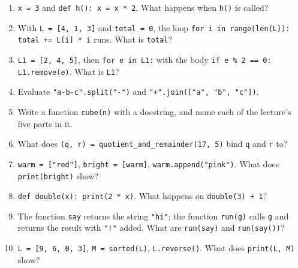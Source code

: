 \documentclass[11pt]{article}
\begin{document}
\begin{keepsection}
\begin{enumerate}
\item \texttt{x = 3} and \texttt{def h(): x = x * 2}. What happens when \texttt{h()} is called?
\item With \texttt{L = [4, 1, 3]} and \texttt{total = 0}, the loop \texttt{for i in range(len(L)): total += L[i] * i} runs. What is \texttt{total}?
\item \texttt{L1 = [2, 4, 5]}, then \texttt{for e in L1:} with the body \texttt{if e \% 2 == 0: L1.remove(e)}. What is \texttt{L1}?
\item Evaluate \texttt{"a-b-c".split("-")} and \texttt{"+".join(["a", "b", "c"])}.
\item Write a function \texttt{cube(n)} with a docstring, and name each of the lecture’s five parts in it.
\item What does \texttt{(q, r) = quotient\_and\_remainder(17, 5)} bind \texttt{q} and \texttt{r} to?
\item \texttt{warm = ["red"]}, \texttt{bright = [warm]}, \texttt{warm.append("pink")}. What does \texttt{print(bright)} show?
\item \texttt{def double(x): print(2 * x)}. What happens on \texttt{double(3) + 1}?
\item The function \texttt{say} returns the string \texttt{"hi"}; the function \texttt{run(g)} calls \texttt{g} and returns the result with \texttt{"!"} added. What are \texttt{run(say)} and \texttt{run(say())}?
\item \texttt{L = [9, 6, 0, 3]}, \texttt{M = sorted(L)}, \texttt{L.reverse()}. What does \texttt{print(L, M)} show?
\end{enumerate}

\end{keepsection}
\end{document}
